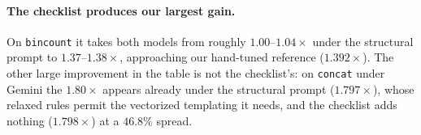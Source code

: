\begin{table}[t]
\centering
\footnotesize
\setlength{\tabcolsep}{2pt}
\caption{E5: speedup against the unmodified program under the constrained (\emph{base}) prompt, the
  relaxed (\emph{struct}) prompt and the relaxed prompt plus the prescriptive checklist (\emph{diag});
  interleaved medians on one idle GH200. \textbf{Bold} marks the cases discussed in the text.
  ``spread'' is the largest repetition spread across the four arms. \texttt{chemv} is excluded
  (see text).}
\label{tab:guidvar}
\end{table}

\paragraph{The checklist produces our largest gain.}
On \texttt{bincount} it takes both models from roughly $1.00$--$1.04\times$ under the structural prompt
to $1.37$--$1.38\times$, approaching our hand-tuned reference ($1.392\times$). The other large
improvement in the table is not the checklist's: on \texttt{concat} under Gemini the $1.80\times$
appears already under the structural prompt ($1.797\times$), whose relaxed rules permit the vectorized
templating it needs, and the checklist adds nothing ($1.798\times$) at a $46.8\%$ spread.

